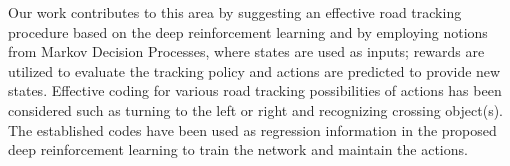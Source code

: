 \documentclass{svproc}
\begin{document}
	
	Our work contributes to this area by suggesting an effective road tracking procedure based on the deep reinforcement learning and by employing notions from  Markov Decision Processes, where states are used as inputs; rewards are utilized to evaluate the tracking policy and actions are predicted to provide new states. Effective coding for various road tracking possibilities of actions has been considered such as turning to the left or right and recognizing crossing object(s). The established codes have been used as regression information in the proposed deep reinforcement learning to	train the network and maintain the actions. 
	
	
\end{document}
